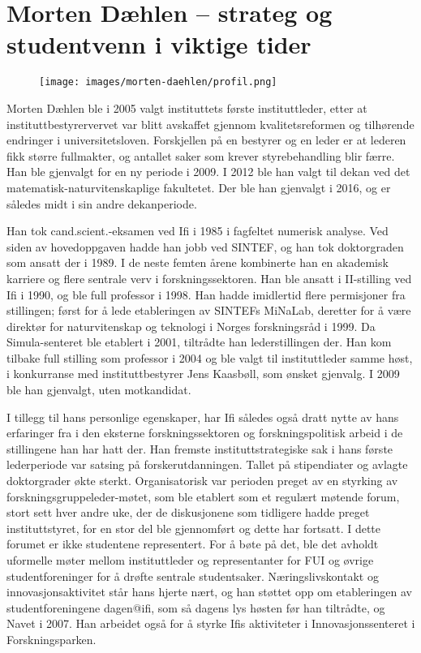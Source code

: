 \chapter[Morten Dæhlen]{Morten Dæhlen – strateg og studentvenn i viktige tider}

\author{Skrevet av Narve Trædal}

\begin{figure}
	\texttt{[image: images/morten-daehlen/profil.png]}
	\label{fig:morten-daehlen}
\end{figure}

Morten Dæhlen ble i 2005 valgt instituttets første instituttleder, etter at instituttbestyrervervet var blitt avskaffet gjennom kvalitetsreformen og tilhørende endringer i universitetsloven. Forskjellen på en bestyrer og en leder er at lederen fikk større fullmakter, og antallet saker som krever styrebehandling blir færre. Han ble gjenvalgt for en ny periode i 2009. I 2012 ble han valgt til dekan ved det matematisk-naturvitenskaplige fakultetet. Der ble han gjenvalgt i 2016, og er således midt i sin andre dekanperiode.

Han tok cand.scient.-eksamen ved Ifi i 1985 i fagfeltet numerisk analyse. Ved siden av hovedoppgaven hadde han jobb ved SINTEF, og han tok doktorgraden som ansatt der i 1989. I de neste femten årene kombinerte han en akademisk karriere og flere sentrale verv i forskningssektoren. Han ble ansatt i II-stilling ved Ifi i 1990, og ble full professor i 1998. Han hadde imidlertid flere permisjoner fra stillingen; først for å lede etableringen av SINTEFs MiNaLab, deretter for å være direktør for naturvitenskap og teknologi i Norges forskningsråd i 1999. Da Simula-senteret ble etablert i 2001, tiltrådte han lederstillingen der. Han kom tilbake full stilling som professor i 2004 og ble valgt til instituttleder samme høst, i konkurranse med instituttbestyrer Jens Kaasbøll, som ønsket gjenvalg. I 2009 ble han gjenvalgt, uten motkandidat.

I tillegg til hans personlige egenskaper, har Ifi således også dratt nytte av hans erfaringer fra i den eksterne forskningssektoren og forskningspolitisk arbeid i de stillingene han har hatt der. Han fremste instituttstrategiske sak i hans første lederperiode var satsing på forskerutdanningen. Tallet på stipendiater og avlagte doktorgrader økte sterkt. Organisatorisk var perioden preget av en styrking av forskningsgruppeleder-møtet, som ble etablert som et regulært møtende forum, stort sett hver andre uke, der de diskusjonene som tidligere hadde preget instituttstyret, for en stor del ble gjennomført og dette har fortsatt. I dette forumet er ikke studentene representert. For å bøte på det, ble det avholdt uformelle møter mellom instituttleder og representanter for FUI og øvrige studentforeninger for å drøfte sentrale studentsaker. Næringslivskontakt og innovasjonsaktivitet står hans hjerte nært, og han støttet opp om etableringen av studentforeningene dagen@ifi, som så dagens lys høsten før han tiltrådte, og Navet i 2007. Han arbeidet også for å styrke Ifis aktiviteter i Innovasjonssenteret i Forskningsparken.

